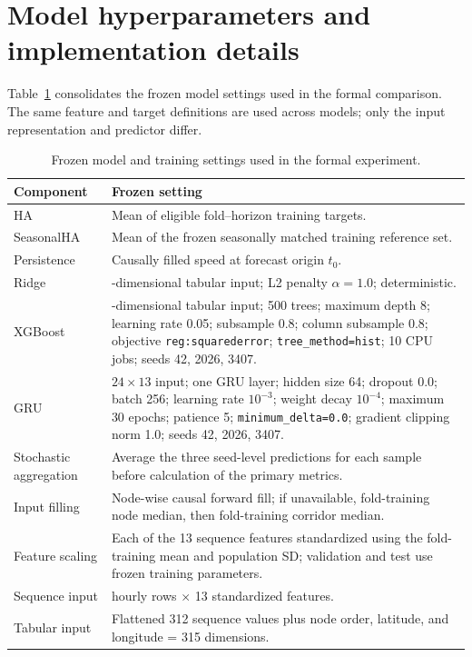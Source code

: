 \documentclass[pdflatex,sn-basic,Numbered]{sn-jnl}
\begin{document}
\section{Model hyperparameters and implementation details}
\label{app:hyperparameters}

Table~\ref{tab:appendix_hyperparameters} consolidates the frozen model settings used in the formal comparison. The same feature and target definitions are used across models; only the input representation and predictor differ.

\begin{table}[!htbp]
\centering
\caption{Frozen model and training settings used in the formal experiment.}
\label{tab:appendix_hyperparameters}
\footnotesize
\begin{tabularx}{\textwidth}{|>{\raggedright\arraybackslash}p{}|>{\raggedright\arraybackslash}X|}
\hline
\textbf{Component} & \textbf{Frozen setting} \\
\hline
HA & Mean of eligible fold--horizon training targets. \\ 
\hline
SeasonalHA & Mean of the frozen seasonally matched training reference set. \\ 
\hline
Persistence & Causally filled speed at forecast origin $t_0$. \\ 
\hline
Ridge & 315-dimensional tabular input; L2 penalty $\alpha=1.0$; deterministic. \\ 
\hline
XGBoost & 315-dimensional tabular input; 500 trees; maximum depth 8; learning rate 0.05; subsample 0.8; column subsample 0.8; objective \texttt{reg:squarederror}; \texttt{tree\_method=hist}; 10 CPU jobs; seeds 42, 2026, 3407. \\ 
\hline
GRU & $24\times13$ input; one GRU layer; hidden size 64; dropout 0.0; batch 256; learning rate $10^{-3}$; weight decay $10^{-4}$; maximum 30 epochs; patience 5; \texttt{minimum\_delta=0.0}; gradient clipping norm 1.0; seeds 42, 2026, 3407. \\ 
\hline
Stochastic aggregation & Average the three seed-level predictions for each sample before calculation of the primary metrics. \\ 
\hline
Input filling & Node-wise causal forward fill; if unavailable, fold-training node median, then fold-training corridor median. \\ 
\hline
Feature scaling & Each of the 13 sequence features standardized using the fold-training mean and population SD; validation and test use frozen training parameters. \\ 
\hline
Sequence input & 24 hourly rows $\times$ 13 standardized features. \\ 
\hline
Tabular input & Flattened 312 sequence values plus node order, latitude, and longitude = 315 dimensions. \\
\hline
\end{tabularx}
\end{table}
\end{document}
